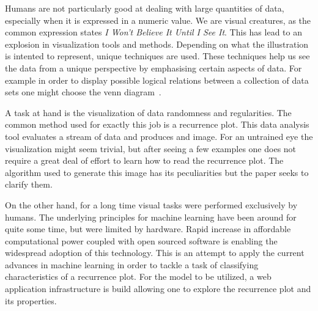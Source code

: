 Humans are not particularly good at dealing with large quantities of data, especially when it is expressed in a numeric value.
We are visual creatures, as the common expression states \emph{I Won’t Believe It Until I See It}.
This has lead to an explosion in visualization tools and methods.
Depending on what the illustration is intented to represent, unique techniques are used.
These techniques help us see the data from a unique perspective by emphasising certain aspects of data.
For example in order to display possible logical relations between a collection of data sets one might choose the venn diagram~\cite{venn-diagram}.

A task at hand is the visualization of data randomness and regularities.
The common method used for exactly this job is a recurrence plot.
This data analysis tool evaluates a stream of data and produces and image.
For an untrained eye the visualization might seem trivial, but after seeing a few examples one does not require a great deal of effort to learn how to read the recurrence plot.
The algorithm used to generate this image has its peculiarities but the paper seeks to clarify them.

On the other hand, for a long time visual tasks were performed exclusively by humans.
The underlying principles for machine learning have been around for quite some time, but were limited by hardware.
Rapid increase in affordable computational power coupled with open sourced software is enabling the widespread adoption of this technology.
This is an attempt to apply the current advances in machine learning in order to tackle a task of classifying characteristics of a recurrence plot.
For the model to be utilized, a web application infrastructure is build allowing one to explore the recurrence plot and its properties.